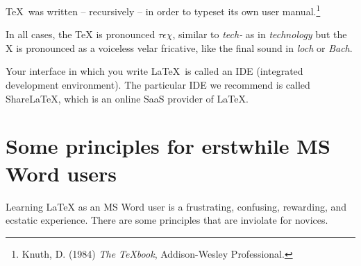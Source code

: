 \documentclass[a4paper,11pt]{scrreprt}\usepackage[]{graphicx}\usepackage[]{color}
\let\oldLaTeX\LaTeX
\renewcommand{\LaTeX}{\textrm{\oldLaTeX}}
\begin{document}
\TeX\ was written -- recursively -- in order to typeset its own user manual.\footnote{Knuth, D. (1984) \textit{The \TeX book}, Addison-Wesley Professional.} 

In all cases, the \TeX{} is pronounced \(\tau\epsilon\chi\), similar to \emph{tech-} as in \emph{technology} but the X is pronounced as a voiceless velar fricative, like the final sound in \emph{loch} or \emph{Bach}. 

Your interface in which you write \LaTeX\ is called an IDE (integrated development environment). The particular IDE we recommend is called ShareLaTeX, which is an online SaaS provider of \LaTeX. 

\newpage

 \chapter{Some principles for erstwhile MS Word users}
 Learning \LaTeX{} as an MS Word user is a frustrating, confusing, rewarding, and ecstatic experience.  There are some principles that are inviolate for novices.
\end{document}

